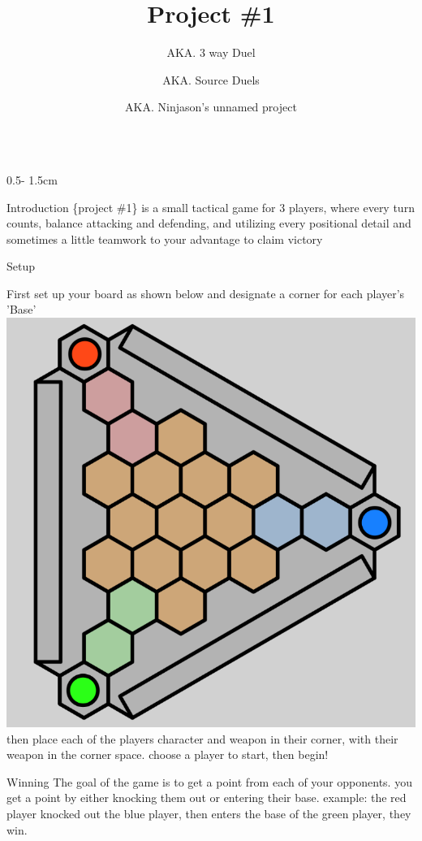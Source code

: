 \documentclass{uioposter}
\title{Project \#1}
\author
{%
    AKA. 3 way Duel
    \and
    AKA. Source Duels
    \and
    AKA. Ninjason's unnamed project
}
\institute
{
    3 Players
    \and
    5-10 minutes
    \and
    ages 10?+ idk
}
\begin{document}
\begin{frame}
\begin{columns}[onlytextwidth]


\begin{column}{0.5\textwidth - 1.5cm}

    \begin{block}{Introduction}
        \{project \#1\} is a small tactical game for 3 players, where every turn counts, balance attacking and defending, and utilizing every positional detail and sometimes a little teamwork to your advantage to claim victory
    \end{block}

    \begin{block}{Setup}
        \raggedright
        First set up your board as shown below and designate a corner for each player's 'Base'
        \includegraphics[]{Img/3DuelBoard.png}
        \newline
        then place each of the players character and weapon in their corner, with their weapon in the corner space. choose a player to start, then begin!
    \end{block}

    \begin{block}{Winning}
        The goal of the game is to get a point from each of your opponents. you get a point by either knocking them out or entering their base.
        \newline
        example: the red player knocked out the blue player, then enters the base of the green player, they win.
    \end{block}


\end{column}
\end{columns}
\end{frame}
\end{document}
